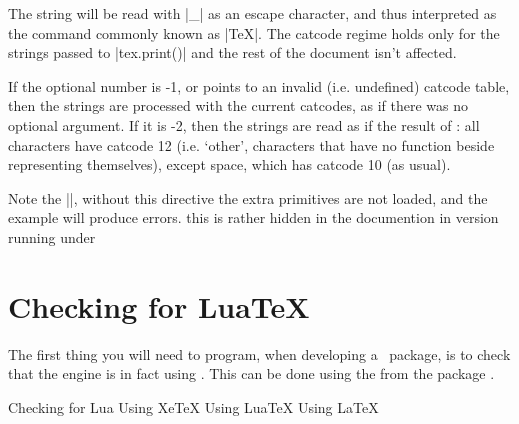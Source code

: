 The string will be read with |_| as an escape character, and thus interpreted as the command commonly known as |\TeX|. The catcode regime holds only for the strings passed to |tex.print()| and the rest of the document isn't affected.

If the optional number is -1, or points to an invalid (i.e. undefined) catcode table, then the strings are processed with the current catcodes, as if there was no optional argument. If it is -2, then the strings are read as if the result of \cmd{\detokenize}: all characters have catcode 12 (i.e. `other', characters that have no function beside representing themselves), except space, which has catcode 10 (as usual).

\begin{scriptexample}[]{}
Note the ||, without this directive the extra primitives are not loaded, and the example will produce errors. this is rather hidden in the documention in version \the\luatexversion running under \formatname
\end{scriptexample}

\section{Checking for LuaTeX}

The first thing you will need to program, when developing a \luatex\ package, is to check that the engine is in fact using \luatex. This can be done using the  from the package . 

\begin{texexample}{Checking for Lua}{}
\ifxetex
  Using XeTeX
\else
  \ifluatex
   Using LuaTeX
  \else
   Using LaTeX
  \fi
\fi
\end{texexample}


